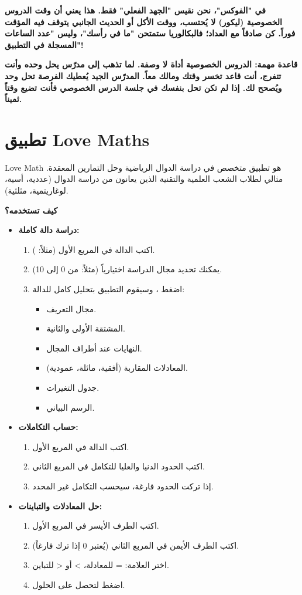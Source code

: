 \documentclass[12pt,a4paper]{book}
\newcommand{\importantAr}[1]{%
	\begin{important}
		\bfseries #1
	\end{important}
}
\begin{document}
\importantAr{في "الفوكس"، نحن نقيس "الجهد الفعلي" فقط. هذا يعني أن وقت الدروس الخصوصية (ليكور) لا يُحتسب، ووقت الأكل أو الحديث الجانبي يتوقف فيه المؤقت فوراً. كن صادقاً مع العداد؛ فالبكالوريا ستمتحن "ما في رأسك"، وليس "عدد الساعات المسجلة في التطبيق"!}


\importantAr{قاعدة مهمة: الدروس الخصوصية أداة لا وصفة. لما تذهب إلى مدرّس يحل وحده وأنت تتفرج، أنت قاعد تخسر وقتك ومالك معاً. المدرّس الجيد يُعطيك الفرصة تحل وحد ويُصحح لك. إذا لم تكن تحل بنفسك في جلسة الدرس الخصوصي فأنت تضيع وقتاً ثميناً.}

\section{تطبيق Love Maths}

Love Math هو تطبيق متخصص في دراسة الدوال الرياضية وحل التمارين المعقدة. مثالي لطلاب الشعب العلمية والتقنية الذين يعانون من دراسة الدوال (عددية، أسية، لوغاريتمية، مثلثية).

\textbf{كيف تستخدمه؟}

\begin{itemize}
	\item \textbf{دراسة دالة كاملة:}
	\begin{enumerate}
		\item اكتب الدالة في المربع الأول (مثلاً: ).
		\item يمكنك تحديد مجال الدراسة اختيارياً (مثلاً: من 0 إلى 10).
		\item اضغط ، وسيقوم التطبيق بتحليل كامل للدالة:
		\begin{itemize}
			\item مجال التعريف.
			\item المشتقة الأولى والثانية.
			\item النهايات عند أطراف المجال.
			\item المعادلات المقاربة (أفقية، مائلة، عمودية).
			\item جدول التغيرات.
			\item الرسم البياني.
		\end{itemize}
	\end{enumerate}
	\item \textbf{حساب التكاملات:}
	\begin{enumerate}
		\item اكتب الدالة في المربع الأول.
		\item اكتب الحدود الدنيا والعليا للتكامل في المربع الثاني.
		\item إذا تركت الحدود فارغة، سيحسب التكامل غير المحدد.
	\end{enumerate}
	\item \textbf{حل المعادلات والتباينات:}
	\begin{enumerate}
		\item اكتب الطرف الأيسر في المربع الأول.
		\item اكتب الطرف الأيمن في المربع الثاني (يُعتبر 0 إذا ترك فارغاً).
		\item اختر العلامة: = للمعادلة، > أو < للتباين.
		\item اضغط  لتحصل على الحلول.
	\end{enumerate}
\end{itemize}
\end{document}
